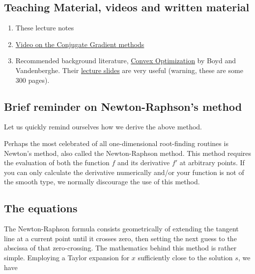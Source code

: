 \documentclass[%
oneside,                 %
final,                   %
10pt]{article}
\begin{document}
\subsection{Teaching Material, videos and written material}
\begin{block}{}
\begin{enumerate}
\item These lecture notes

\item \href{{https://www.youtube.com/watch?v=eAYohMUpPMA&ab_channel=TomCarlone}}{Video on the Conjugate Gradient methods}

\item Recommended background literature, \href{{https://web.stanford.edu/~boyd/cvxbook/}}{Convex Optimization} by Boyd and Vandenberghe. Their \href{{https://web.stanford.edu/~boyd/cvxbook/bv_cvxslides.pdf}}{lecture slides} are very useful (warning, these are some 300 pages).
\end{enumerate}

\noindent
\end{block}

\subsection{Brief reminder on Newton-Raphson's method}

Let us quickly remind ourselves how we derive the above method.

Perhaps the most celebrated of all one-dimensional root-finding
routines is Newton's method, also called the Newton-Raphson
method. This method  requires the evaluation of both the
function $f$ and its derivative $f'$ at arbitrary points. 
If you can only calculate the derivative
numerically and/or your function is not of the smooth type, we
normally discourage the use of this method.

\subsection{The equations}

The Newton-Raphson formula consists geometrically of extending the
tangent line at a current point until it crosses zero, then setting
the next guess to the abscissa of that zero-crossing.  The mathematics
behind this method is rather simple. Employing a Taylor expansion for
$x$ sufficiently close to the solution $s$, we have
\end{document}
